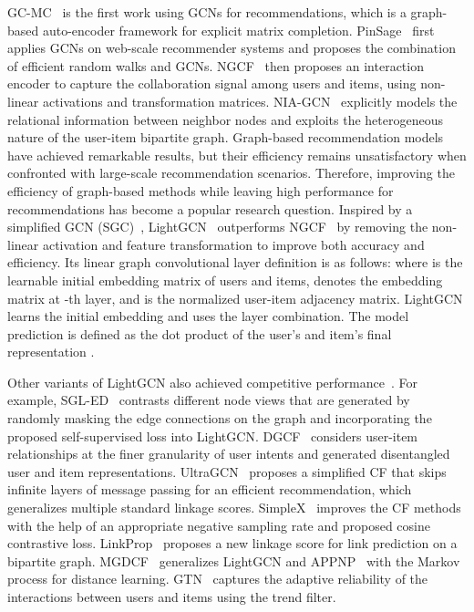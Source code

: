 \documentclass[sigconf,natbib=true]{acmart}
\begin{document}
GC-MC~\cite{Rianne2017GCMC} is the first work using GCNs for recommendations, which is a graph-based auto-encoder framework for explicit matrix completion. PinSage~\cite{Rex2018pinsage} first applies GCNs on web-scale recommender systems and proposes the combination of efficient random walks and GCNs. NGCF~\cite{Wang19NGCF} then proposes an interaction encoder to capture the collaboration signal among users and items, using non-linear activations and transformation matrices. NIA-GCN~\cite{sun2020NIA-GCN} explicitly models the relational information between neighbor nodes and exploits the heterogeneous nature of the user-item bipartite graph.
Graph-based recommendation models have achieved remarkable results, but their efficiency remains unsatisfactory when confronted with large-scale recommendation scenarios. Therefore, improving the efficiency of graph-based methods while leaving high performance for recommendations has become a popular research question. Inspired by a simplified GCN (SGC)~\cite{Wu2019SGC}, LightGCN~\cite{He20LightGCN} outperforms NGCF~\cite{Wang19NGCF} by removing the non-linear activation and feature transformation to improve both accuracy and efficiency. Its linear graph convolutional layer definition is as follows:
 where  is the learnable initial embedding matrix of users and items,  denotes the embedding matrix at -th layer, and  is the normalized user-item adjacency matrix. LightGCN learns the initial embedding and uses the layer combination. The model prediction is defined as the dot product of the user’s and item’s final representation . 

Other variants of LightGCN also achieved competitive performance~\cite{Xiang2020DGCF19,Mao21UltraGCN,Wu2021SGLED,mao2021simplex,fu2022revisiting,lee2021BUIR,hu2022mgdcf}. For example, SGL-ED~\cite{Wu2021SGLED} contrasts different node views that are generated by randomly masking the edge connections on the graph and incorporating the proposed self-supervised loss into LightGCN. DGCF~\cite{Xiang2020DGCF19} considers user-item relationships at the finer granularity of user intents and generated disentangled user and item representations. UltraGCN~\cite{Mao21UltraGCN} proposes a simplified CF that skips infinite layers of message passing for an efficient recommendation, which generalizes multiple standard linkage scores. SimpleX~\cite{mao2021simplex} improves the CF methods with the help of an appropriate negative sampling rate and proposed cosine contrastive loss. LinkProp~\cite{fu2022revisiting} proposes a new linkage score for link prediction on a bipartite graph. MGDCF~\cite{hu2022mgdcf} generalizes LightGCN and APPNP~\cite{Klicpera2019APPNP} with the Markov process for distance learning. GTN~\cite{fan2022GTN} captures the adaptive reliability of the interactions between users and items using the trend filter.
\end{document}
